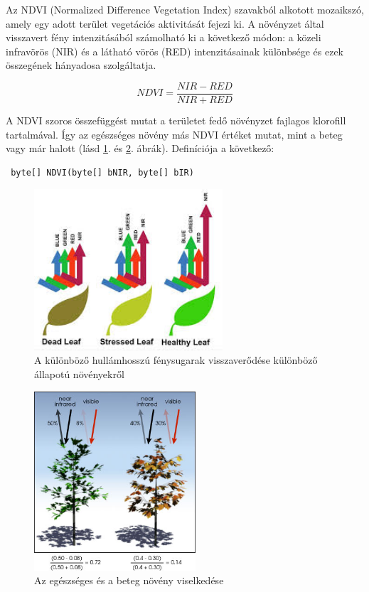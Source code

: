 \documentclass[a4paper,12pt]{article}
\begin{document}
Az NDVI (Normalized Difference Vegetation Index) szavakból alkotott mozaikszó, amely egy adott terület vegetációs aktivitását fejezi ki. A növényzet által visszavert fény intenzitásából számolható ki a következő módon: a közeli infravörös (NIR) és a látható vörös (RED) intenzitásainak különbsége és ezek összegének hányadosa szolgáltatja.

$$NDVI = \frac{NIR - RED}{NIR + RED} $$

A NDVI szoros összefüggést mutat a területet fedő növényzet fajlagos klorofill tartalmával. Így az egészséges növény más NDVI értéket mutat, mint a beteg vagy már halott (lásd \ref{fig:ndvi0}. és \ref{fig:ndvi1}. ábrák).
Definíciója a következő: 
\begin{verbatim} byte[] NDVI(byte[] bNIR, byte[] bIR) \end{verbatim}

\begin{figure}
	\centering
	\includegraphics[width=7cm]{ndvi0.jpg}
	\caption{A különböző hullámhosszú fénysugarak visszaverődése különböző állapotú növényekről}
	\label{fig:ndvi0}
\end{figure}

\begin{figure}
	\centering
	\includegraphics[width=6cm]{ndvi1.png}
	\caption{Az egészséges és a beteg növény viselkedése}
	\label{fig:ndvi1}
\end{figure}
\end{document}
